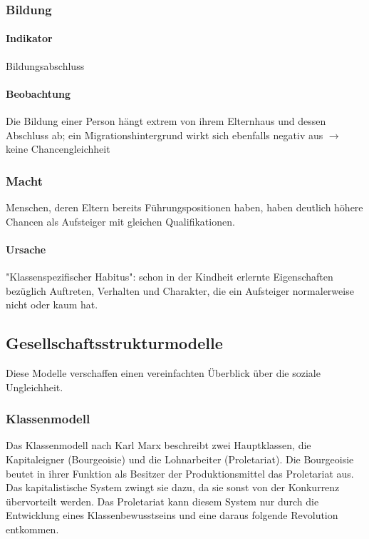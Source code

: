 \documentclass{article}
\begin{document}
	\subsubsection{Bildung}
	\paragraph{Indikator}
	Bildungsabschluss
	
	\paragraph{Beobachtung}
	Die Bildung einer Person hängt extrem von ihrem Elternhaus und dessen Abschluss ab; ein Migrationshintergrund wirkt sich ebenfalls negativ aus $\rightarrow$ keine Chancengleichheit

	\subsubsection{Macht}
	Menschen, deren Eltern bereits Führungspositionen haben, haben deutlich höhere Chancen als Aufsteiger mit gleichen Qualifikationen.

	\paragraph{Ursache}
	"Klassenspezifischer Habitus": schon in der Kindheit erlernte Eigenschaften bezüglich Auftreten, Verhalten und Charakter, die ein Aufsteiger normalerweise nicht oder kaum hat.

	\subsection{Gesellschaftsstrukturmodelle}
	Diese Modelle verschaffen einen vereinfachten Überblick über die soziale Ungleichheit.

	\subsubsection{Klassenmodell}
	Das Klassenmodell nach Karl Marx beschreibt zwei Hauptklassen, die Kapitaleigner (Bourgeoisie) und die Lohnarbeiter (Proletariat). Die Bourgeoisie beutet in ihrer Funktion als Besitzer der Produktionsmittel das Proletariat aus. Das kapitalistische System zwingt sie dazu, da sie sonst von der Konkurrenz übervorteilt werden. Das Proletariat kann diesem System nur durch die Entwicklung eines Klassenbewusstseins und eine daraus folgende Revolution entkommen.
\end{document}

